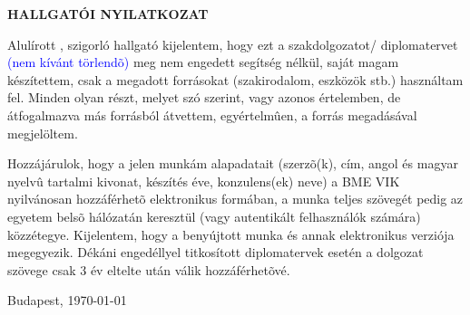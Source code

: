 \begin{center}
\large
\textbf{HALLGATÓI NYILATKOZAT}\\
\end{center}

Alulírott \emph{\vikszerzo}, szigorló hallgató kijelentem, hogy ezt a szakdolgozatot/ diplomatervet \textcolor{blue}{(nem kívánt törlendõ)} meg nem engedett segítség nélkül, saját magam készítettem, csak a megadott forrásokat (szakirodalom, eszközök stb.) használtam fel. Minden olyan részt, melyet szó szerint, vagy azonos értelemben, de átfogalmazva más forrásból átvettem, egyértelmûen, a forrás megadásával megjelöltem.

Hozzájárulok, hogy a jelen munkám alapadatait (szerzõ(k), cím, angol és magyar nyelvû tartalmi kivonat, készítés éve, konzulens(ek) neve) a BME VIK nyilvánosan hozzáférhetõ elektronikus formában, a munka teljes szövegét pedig az egyetem belsõ hálózatán keresztül (vagy autentikált felhasználók számára) közzétegye. Kijelentem, hogy a benyújtott munka és annak elektronikus verziója megegyezik. Dékáni engedéllyel titkosított diplomatervek esetén a dolgozat szövege csak 3 év eltelte után válik hozzáférhetõvé.

\begin{flushleft}
\vspace*{1cm}
Budapest, \today
\end{flushleft}

\begin{flushright}
 \vspace*{1cm}
 \makebox[7cm]{\rule{6cm}{.4pt}}\\
 \makebox[7cm]{\emph{\vikszerzo}}\\
\end{flushright}
\thispagestyle{empty}

\vfill
\clearpage
\thispagestyle{empty} %


